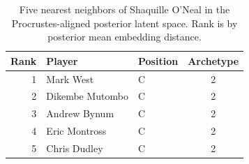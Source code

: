 \begin{table}[htbp]
  \centering\small
  \begin{tabular}{rllc}
    \toprule
    Rank & Player & Position & Archetype \\
    \midrule
    1 & Mark West & C & 2 \\
    2 & Dikembe Mutombo & C & 2 \\
    3 & Andrew Bynum & C & 2 \\
    4 & Eric Montross & C & 2 \\
    5 & Chris Dudley & C & 2 \\
    \bottomrule
  \end{tabular}
  \caption{Five nearest neighbors of Shaquille O'Neal in the Procrustes-aligned posterior latent space. Rank is by posterior mean embedding distance.}
  \label{tab:Shaquille_O_Neal_neighbors}
\end{table}

